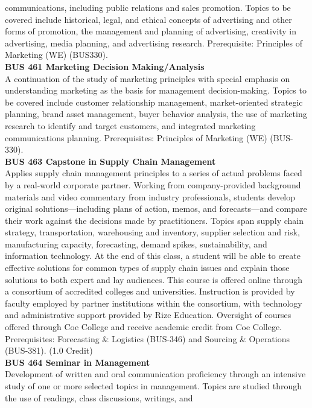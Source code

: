 \documentclass[
  letterpaper,
]{scrbook}
\begin{document}
communications, including public relations and sales promotion. Topics
to be covered include historical, legal, and ethical concepts of
advertising and other forms of promotion, the management and planning of
advertising, creativity in advertising, media planning, and advertising
research. Prerequisite: Principles of Marketing (WE) (BUS330).\\
\textbf{BUS 461 Marketing Decision Making/Analysis}\\
A continuation of the study of marketing principles with special
emphasis on understanding marketing as the basis for management
decision-making. Topics to be covered include customer relationship
management, market-oriented strategic planning, brand asset management,
buyer behavior analysis, the use of marketing research to identify and
target customers, and integrated marketing communications planning.
Prerequisites: Principles of Marketing (WE) (BUS-330).\\
\textbf{BUS 463 Capstone in Supply Chain Management}\\
Applies supply chain management principles to a series of actual
problems faced by a real-world corporate partner. Working from
company-provided background materials and video commentary from industry
professionals, students develop original solutions---including plans of
action, memos, and forecasts---and compare their work against the
decisions made by practitioners. Topics span supply chain strategy,
transportation, warehousing and inventory, supplier selection and risk,
manufacturing capacity, forecasting, demand spikes, sustainability, and
information technology. At the end of this class, a student will be able
to create effective solutions for common types of supply chain issues
and explain those solutions to both expert and lay audiences. This
course is offered online through a consortium of accredited colleges and
universities. Instruction is provided by faculty employed by partner
institutions within the consortium, with technology and administrative
support provided by Rize Education. Oversight of courses offered through
Coe College and receive academic credit from Coe College. Prerequisites:
Forecasting \& Logistics (BUS-346) and Sourcing \& Operations (BUS-381).
(1.0 Credit)\\
\textbf{BUS 464 Seminar in Management}\\
Development of written and oral communication proficiency through an
intensive study of one or more selected topics in management. Topics are
studied through the use of readings, class discussions, writings, and
\end{document}
